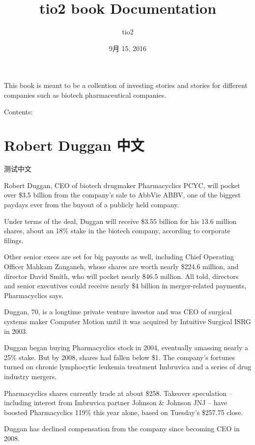 \documentclass[letterpaper,12pt,english]{sphinxmanual}
\title{tio2 book Documentation}
\date{9月 15, 2016}
\author{tio2}
\begin{document}
\maketitle
\tableofcontents
{}\label{index::doc}


This book is meant to be a collention of investing stories and stories for different companies such as biotech pharmaceutical companies.

Contents:


\chapter{Robert Duggan 中文}
\label{chapters/chapter1:welcome-to-tio2-book-s-documentation}\label{chapters/chapter1::doc}\label{chapters/chapter1:robert-duggan}\label{chapters/chapter1:robertduggan}
测试中文

Robert Duggan, CEO of biotech drugmaker Pharmacyclics PCYC,  will pocket over \$3.5 billion from the company’s sale to AbbVie ABBV, one of the biggest paydays ever from the buyout of a publicly held company.

Under terms of the deal, Duggan will receive \$3.55 billion for his 13.6 million shares, about an 18\% stake in the biotech company, according to corporate filings.

Other senior execs are set for big payouts as well, including Chief Operating Officer Mahkam Zanganeh, whose shares are worth nearly \$224.6 million, and director David Smith, who will pocket nearly \$46.5 million. All told, directors and senior executives could  receive nearly \$4 billion in merger-related payments, Pharmacyclics says.

Duggan, 70, is a longtime private venture investor and was CEO of surgical systems maker Computer Motion until it was acquired by Intuitive Surgical  ISRG in 2003.

Duggan began buying Pharmacyclics stock in 2004, eventually amassing nearly a 25\% stake. But  by 2008, shares had fallen below \$1.  The company’s fortunes turned on chronic lymphocytic leukemia treatment Imbruvica and a series of drug industry mergers.

Pharmacyclics shares currently trade at about \$258.  Takeover speculation – including interest  from Imbruvica partner Johnson \& Johnson  JNJ – have boosted Pharmacyclics 119\%  this year alone, based on Tuesday’s \$257.75 close.

Duggan has declined compensation from the company since becoming CEO in 2008.
\end{document}
